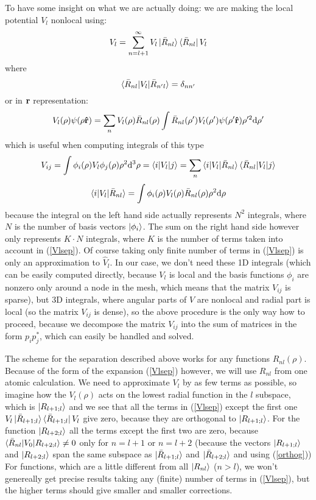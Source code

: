 To have some insight on what we are actually doing: we are making the local potential $V_l$ nonlocal using: 
\begin{equation}
  V_l=\sum_{n=l+1}^\infty V_l\mathinner{|{\bar R_{nl}}\rangle}\mathinner{\langle{\bar R_{nl}}|}V_l  \label{Vlsep}
\end{equation}
where 
\begin{equation*}
  \mathinner{\langle{\bar R_{nl}|V_l|\bar R_{n'l}}\rangle}=\delta_{nn'}
\end{equation*}
or in ${\bf r}$ representation: 
\begin{equation*}
  V_l(\rho)\psi(\rho {\bf\hat r})=\sum_n V_l(\rho)\bar R_{nl}(\rho) \int\bar R_{nl}(\rho')V_l(\rho')\psi(\rho'{\bf\hat r})\rho'^2{\rm d} \rho'
\end{equation*}
which is useful when computing integrals of this type 
\begin{equation*}
  V_{ij} =\int\phi_i(\rho) V_l \phi_j(\rho) \rho^2{\rm d}^3 \rho =\mathinner{\langle{i|V_l|j}\rangle}= \sum_n \mathinner{\langle{i|V_l|{\bar R_{nl}}}\rangle}\mathinner{\langle{\bar R_{nl}|V_l|j}\rangle}
\end{equation*}
\begin{equation*}
  \mathinner{\langle{i|V_l|{\bar R_{nl}}}\rangle}=\int\phi_i(\rho)V_l(\rho)\bar R_{nl}(\rho) \rho^2{\rm d}\rho
\end{equation*}
because the integral on the left hand side actually represents $N^2$ integrals, where $N$ is the number of basis vectors $\mathinner{|{\phi_i}\rangle}$. The sum on the right hand side however only represents $K\cdot N$ integrals, where $K$ is the number of terms taken into account in (\ref{Vlsep}). Of course taking only finite number of terms in (\ref{Vlsep}) is only an approximation to $\hat V_l$. In our case, we don't need these 1D integrals (which can be easily computed directly, because $V_l$ is local and the basis functions $\phi_i$ are nonzero only around a node in the mesh, which means that the matrix $V_{ij}$ is sparse), but 3D integrals, where angular parts of $V$ are nonlocal and radial part is local (so the matrix $V_{ij}$ is dense), so the above procedure is the only way how to proceed, because we decompose the matrix $V_{ij}$ into the sum of matrices in the form $p_ip_j^*$, which can easily be handled and solved.

The scheme for the separation described above works for any functions $R_{nl}(\rho)$. Because of the form of the expansion (\ref{Vlsep}) however, we will use $R_{nl}$ from one atomic calculation. We need to approximate $V_l$ by as few terms as possible, so imagine how the $V_l(\rho)$ acts on the lowest radial function in the $l$ subspace, which is $\mathinner{|{R_{l+1;l}}\rangle}$ and we see that all the terms in (\ref{Vlsep}) except the first one $V_l\mathinner{|{\bar R_{l+1;l}}\rangle}\mathinner{\langle{\bar R_{l+1;l}}|}V_l$ give zero, because they are orthogonal to $\mathinner{|{R_{l+1;l}}\rangle}$. For the function $\mathinner{|{R_{l+2;l}}\rangle}$ all the terms except the first two are zero, because $\mathinner{\langle{\bar R_{nl}|V_0|R_{l+2;l}}\rangle}\neq0$ only for $n=l+1$ or $n=l+2$ (because the vectors $\mathinner{|{R_{l+1;l}}\rangle}$ and $\mathinner{|{R_{l+2;l}}\rangle}$ span the same subspace as $\mathinner{|{\bar R_{l+1;l}}\rangle}$ and $\mathinner{|{\bar R_{l+2;l}}\rangle}$ and using (\ref{orthog})) For functions, which are a little different from all $\mathinner{|{R_{nl}}\rangle}$ ($n>l$), we won't genereally get precise results taking any (finite) number of terms in (\ref{Vlsep}), but the higher terms should give smaller and smaller corrections.

